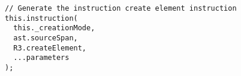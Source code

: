 \begin{verbatim}
// Generate the instruction create element instruction
this.instruction(
  this._creationMode,
  ast.sourceSpan,
  R3.createElement,
  ...parameters
);
\end{verbatim}
